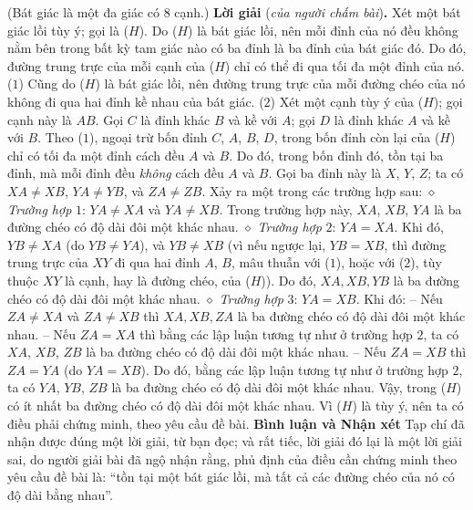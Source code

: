 \begin{multicols}{2}
	(Bát giác là một đa giác có $8$ cạnh.)
	\vskip 0.05cm
	\textbf{\color{thachthuctoanhoc}Lời giải} (\textit{của người chấm bài})\textbf{\color{thachthuctoanhoc}.}
	\vskip 0.05cm
	Xét một bát giác lồi tùy ý; gọi là ($H$).
	\vskip 0.05cm
	Do ($H$) là bát giác lồi, nên mỗi đỉnh của nó đều không nằm bên trong bất kỳ tam giác nào có ba đỉnh là ba đỉnh của bát giác đó. Do đó, đường trung trực của mỗi cạnh của ($H$) chỉ có thể đi qua tối đa một đỉnh của nó. \hfill ($1$)
	\vskip 0.05cm
	Cũng do ($H$) là bát giác lồi, nên đường trung trực của mỗi đường chéo của nó không đi qua hai đỉnh kề nhau của bát giác.                 \hfill ($2$)
	\vskip 0.05cm
	Xét một cạnh tùy ý của ($H$); gọi cạnh này là $AB$. Gọi $C$ là đỉnh khác $B$ và kề với $A$; gọi $D$ là đỉnh khác $A$ và kề với $B$.
	\vskip 0.05cm
	Theo ($1$), ngoại trừ bốn đỉnh $C$, $A$, $B$, $D$, trong bốn đỉnh còn lại của ($H$) chỉ có tối đa một đỉnh cách đều $A$ và $B$. Do đó, trong bốn đỉnh đó, tồn tại ba đỉnh, mà mỗi đỉnh đều \textit{không} cách đều $A$ và $B$. Gọi ba đỉnh này là $X$, $Y$, $Z$; ta có $XA \ne XB$, $YA \ne YB$, và $ZA \ne ZB$. Xảy ra một trong các trường hợp sau:
	\vskip 0.05cm
	$\diamond$ \textit{Trường hợp} $1$: $YA \ne XA$ và $YA \ne XB$.
	\vskip 0.05cm
	Trong trường hợp này, $XA$, $XB$, $YA$ là ba đường chéo có độ dài đôi một khác nhau.
	\vskip 0.05cm
	$\diamond$ \textit{Trường hợp} $2$: $YA = XA$.
	\vskip 0.05cm
	Khi đó, $YB \ne XA$ (do $YB \ne YA$), và \linebreak$YB \ne XB$ (vì nếu ngược lại, $YB = XB$, thì đường trung trực của $XY$ đi qua hai đỉnh $A$, $B$, mâu thuẫn với ($1$), hoặc với ($2$), tùy thuộc $XY$ là cạnh, hay là đường chéo, của ($H$)). Do đó, $XA, XB, YB$ là ba đường chéo có độ dài đôi một khác nhau.
	\vskip 0.05cm
	$\diamond$ \textit{Trường hợp} $3$: $YA = XB$.
	\vskip 0.05cm
	Khi đó:
	\vskip 0.05cm
	-- Nếu $ZA \ne XA$ và $ZA \ne XB$ thì $XA, XB, ZA$ là ba đường chéo có độ dài đôi một khác nhau.
	\vskip 0.05cm
	-- Nếu $ZA = XA$ thì bằng các lập luận tương tự như ở trường hợp $2$, ta có $XA$, $XB$, $ZB$ là ba đường chéo có độ dài đôi một khác nhau.
	\vskip 0.05cm
	-- Nếu $ZA = XB$ thì $ZA = YA$ (do $YA = XB$). Do đó, bằng các lập luận tương tự như ở trường hợp $2$, ta có $YA$, $YB$, $ZB$ là ba đường chéo có độ dài đôi một khác nhau.
	\vskip 0.05cm
	Vậy, trong ($H$) có ít nhất ba đường chéo có độ dài đôi một khác nhau.
	\vskip 0.05cm
	Vì ($H$) là tùy ý, nên ta có điều phải chứng minh, theo yêu cầu đề bài.
	\vskip 0.05cm
	\textbf{\color{thachthuctoanhoc}Bình luận và Nhận xét}
	\vskip 0.05cm
	Tạp chí đã nhận được đúng một lời giải, từ bạn đọc; và rất tiếc, lời giải đó lại là một lời giải sai, do người giải bài đã ngộ nhận rằng, phủ định của điều cần chứng minh theo yêu cầu đề bài là: “tồn tại một bát giác lồi, mà tất cả các đường chéo của nó có độ dài bằng nhau”.

\end{multicols}
